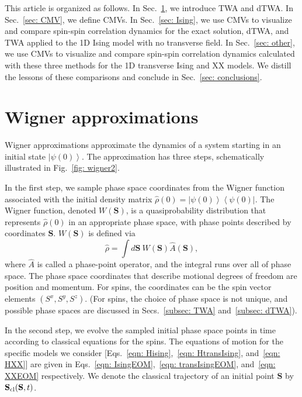 \documentclass[pra,reprint,superscriptaddress]{revtex4-1}
\newcommand{\ket}[1]{\left| #1 \right\rangle}
\newcommand{\bra}[1]{\left\langle #1 \right|}
\begin{document}
This article is organized as follows. In Sec.~\ref{sec: Wigner}, we introduce TWA and dTWA. In Sec.~\ref{sec: CMV}, we define CMVs. In Sec.~\ref{sec: Ising}, we use CMVs to visualize and compare spin-spin correlation dynamics for the exact solution, dTWA, and TWA applied to the 1D Ising model with no transverse field. In Sec.~\ref{sec: other}, we use CMVs to visualize and compare spin-spin correlation dynamics calculated with these three methods for the 1D transverse Ising and XX models. We distill the lessons of these comparisons and conclude in Sec.~\ref{sec: conclusions}.

\section{Wigner approximations}\label{sec: Wigner}
Wigner approximations approximate the dynamics of a system starting in an initial state $\ket{\psi(0)}$. The approximation has three steps, schematically illustrated in Fig.~\ref{fig: wigner2}. 

In the first step, we sample phase space coordinates from the Wigner function associated with the initial density matrix $\hat{\rho}(0) = \ket{\psi(0)}\bra{\psi(0)}$. The Wigner function, denoted $W(\mathbf{S})$, is a quasiprobability distribution that represents $\hat{\rho}(0)$ in an appropriate phase space, with phase points described by coordinates $\mathbf{S}$. $W(\mathbf{S})$ is defined via
\begin{equation}
\hat{\rho} = \int\! d\mathbf{S}~W(\mathbf{S}) \hat{A}(\mathbf{S}), \label{eqn: W}
\end{equation}
where $\hat{A}$ is called a phase-point operator, and the integral runs over all of phase space. The phase space coordinates that describe motional degrees of freedom are position and momentum. For spins, the coordinates can be the spin vector elements $(S^x, S^y, S^z)$. (For spins, the choice of phase space is not unique, and possible phase spaces are discussed in Secs.~\ref{subsec: TWA} and~\ref{subsec: dTWA}).

In the second step, we evolve the sampled initial phase space points in time according to classical equations for the spins. The equations of motion for the specific models we consider [Eqs.~\eqref{eqn: Hising},~\eqref{eqn: HtransIsing}, and~\eqref{eqn: HXX}] are given in Eqs.~\eqref{eqn: IsingEOM},~\eqref{eqn: transIsingEOM}, and~\eqref{eqn: XXEOM} respectively. We denote the classical trajectory of an initial point $\mathbf{S}$ by $\mathbf{S}_{\rm cl}(\mathbf{S},t)$.
\end{document}
